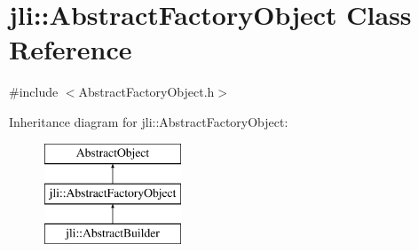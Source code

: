 \hypertarget{classjli_1_1_abstract_factory_object}{\section{jli\+:\+:Abstract\+Factory\+Object Class Reference}
\label{classjli_1_1_abstract_factory_object}
}


{\ttfamily \#include $<$Abstract\+Factory\+Object.\+h$>$}

Inheritance diagram for jli\+:\+:Abstract\+Factory\+Object\+:\begin{figure}[H]
\begin{center}
\leavevmode
\includegraphics[height=3.000000cm]{classjli_1_1_abstract_factory_object}
\end{center}
\end{figure}
